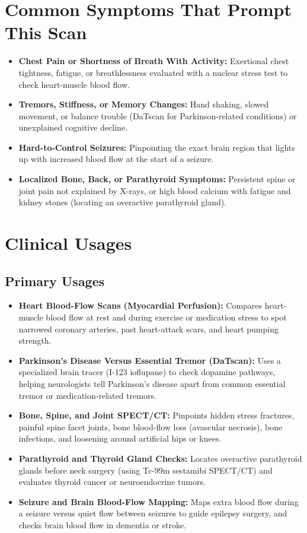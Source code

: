 \section{Common Symptoms That Prompt This Scan}
\begin{itemize}
    \item \textbf{Chest Pain or Shortness of Breath With Activity:} Exertional chest tightness, fatigue, or breathlessness evaluated with a nuclear stress test to check heart-muscle blood flow.
    \item \textbf{Tremors, Stiffness, or Memory Changes:} Hand shaking, slowed movement, or balance trouble (DaTscan for Parkinson-related conditions) or unexplained cognitive decline.
    \item \textbf{Hard-to-Control Seizures:} Pinpointing the exact brain region that lights up with increased blood flow at the start of a seizure.
    \item \textbf{Localized Bone, Back, or Parathyroid Symptoms:} Persistent spine or joint pain not explained by X-rays, or high blood calcium with fatigue and kidney stones (locating an overactive parathyroid gland).
\end{itemize}

\section{Clinical Usages}

\subsection{Primary Usages}

\begin{itemize}
    \item \textbf{Heart Blood-Flow Scans (Myocardial Perfusion):} Compares heart-muscle blood flow at rest and during exercise or medication stress to spot narrowed coronary arteries, past heart-attack scars, and heart pumping strength.
    \item \textbf{Parkinson's Disease Versus Essential Tremor (DaTscan):} Uses a specialized brain tracer (I-123 ioflupane) to check dopamine pathways, helping neurologists tell Parkinson's disease apart from common essential tremor or medication-related tremors.
    \item \textbf{Bone, Spine, and Joint SPECT/CT:} Pinpoints hidden stress fractures, painful spine facet joints, bone blood-flow loss (avascular necrosis), bone infections, and loosening around artificial hips or knees.
    \item \textbf{Parathyroid and Thyroid Gland Checks:} Locates overactive parathyroid glands before neck surgery (using Tc-99m sestamibi SPECT/CT) and evaluates thyroid cancer or neuroendocrine tumors.
    \item \textbf{Seizure and Brain Blood-Flow Mapping:} Maps extra blood flow during a seizure versus quiet flow between seizures to guide epilepsy surgery, and checks brain blood flow in dementia or stroke.
\end{itemize}


